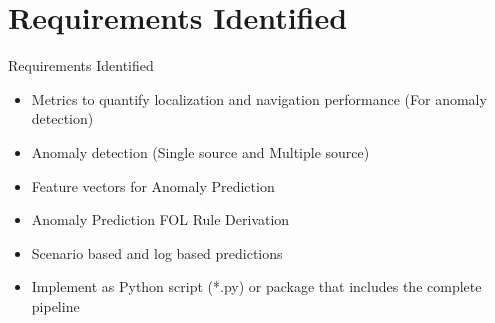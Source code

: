 \documentclass[aspectratio=169, 11pt]{beamer}
\begin{document}
\iffalse

\section{Requirements Identified}

\begin{frame}{Requirements Identified}
  \begin{itemize}
    \item Metrics to quantify localization and navigation performance (For anomaly detection)
    \item Anomaly detection (Single source and Multiple source)
    \item Feature vectors for Anomaly Prediction
    \item Anomaly Prediction FOL Rule Derivation
    \item Scenario based and log based predictions
    \item Implement as Python script (*.py) or package that includes the complete pipeline
  \end{itemize}
\end{frame}
\end{document}

